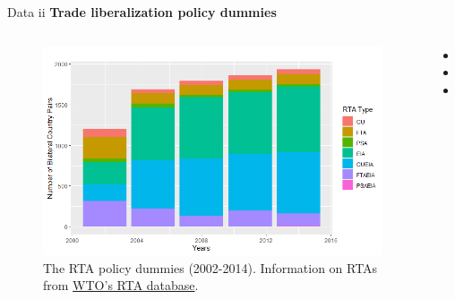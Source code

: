\documentclass[10pt]{beamer}
\begin{document}
\begin{frame}{Data ii} 
\textbf{Trade liberalization policy dummies}
\begin{columns}
      \begin{figure}
    \includegraphics[scale=0.4]{graph_1a.png} %
    \small{\caption{The RTA policy dummies (2002-2014). Information on RTAs from 
    \href{http://rtais.wto.org/UI/PublicMaintainRTAHome.aspx}{WTO's RTA database}.}}
  \end{figure}
  
    \begin{itemize}
          \item {}
          \item {}
          \item {}
    \end{itemize}
\end{columns}
\end{frame}
\end{document}
